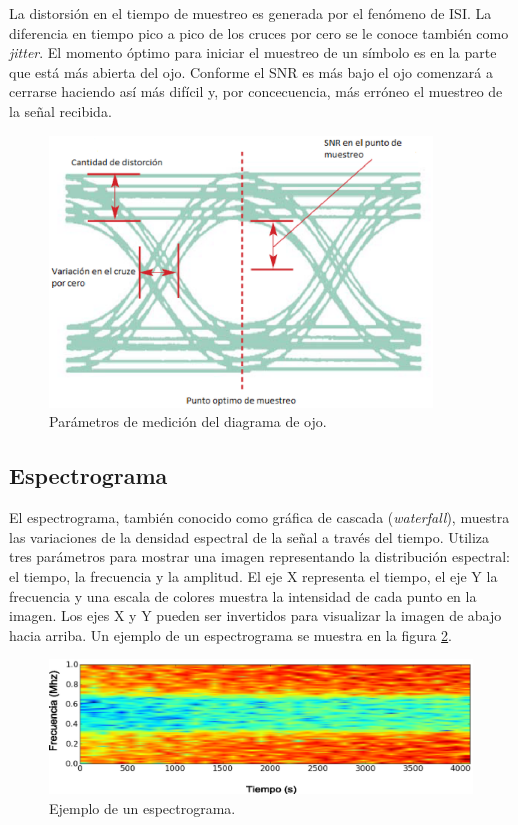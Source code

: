 La distorsi\'on en el tiempo de muestreo es generada por el fen\'omeno de ISI. La diferencia en
tiempo pico a pico de los cruces por cero se le conoce tambi\'en como \emph{jitter}. El momento
\'optimo para iniciar el muestreo de un s\'imbolo es en la parte que est\'a m\'as abierta del ojo. Conforme el
SNR es m\'as bajo el ojo comenzar\'a a cerrarse haciendo as\'i m\'as dif\'icil y, por concecuencia,
m\'as err\'oneo el muestreo de la se\~nal recibida.

\begin{figure}[hbp]
\centering
	\includegraphics[width=4in]{figs/eyeparams}
	\caption{Par\'ametros de medici\'on del diagrama de ojo.}
	\label{fig:eyeparams}
\end{figure}

\subsection{Espectrograma}
El espectrograma, tambi\'en conocido como gr\'afica de cascada (\emph{waterfall}), muestra las variaciones de la densidad
espectral de la se\~nal a trav\'es del tiempo. Utiliza tres par\'ametros para mostrar una imagen representando la distribuci\'on
espectral: el tiempo, la frecuencia y la amplitud. El eje X representa el tiempo, el eje Y la frecuencia y una escala de colores
muestra la intensidad de cada punto en la imagen. Los ejes X y Y pueden ser invertidos para visualizar la imagen de abajo hacia
arriba. Un ejemplo de un espectrograma se muestra en la figura \ref{fig:spectrogram}.

\begin{figure}[tp]
\centering
	\includegraphics[width=5.5in]{figs/spectrogram}
	\vspace{0.3in}
	\caption{Ejemplo de un espectrograma.}
	\label{fig:spectrogram}
\end{figure}

